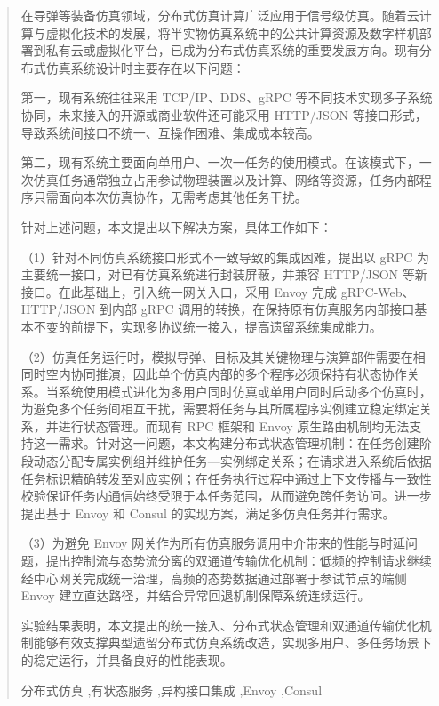 \documentclass[lang=chs, degree=master, blindreview=true, winfonts=true, academic=false]{yanputhesis}
\begin{document}
\begin{abstract}                                            %

在导弹等装备仿真领域，分布式仿真计算广泛应用于信号级仿真。随着云计算与虚拟化技术的发展，将半实物仿真系统中的公共计算资源及数字样机部署到私有云或虚拟化平台，已成为分布式仿真系统的重要发展方向。现有分布式仿真系统设计时主要存在以下问题：

第一，现有系统往往采用 TCP/IP、DDS、gRPC 等不同技术实现多子系统协同，未来接入的开源或商业软件还可能采用 HTTP/JSON 等接口形式，导致系统间接口不统一、互操作困难、集成成本较高。

第二，现有系统主要面向单用户、一次一任务的使用模式。在该模式下，一次仿真任务通常独立占用参试物理装置以及计算、网络等资源，任务内部程序只需面向本次仿真协作，无需考虑其他任务干扰。

针对上述问题，本文提出以下解决方案，具体工作如下：

（1）针对不同仿真系统接口形式不一致导致的集成困难，提出以 gRPC 为主要统一接口，对已有仿真系统进行封装屏蔽，并兼容 HTTP/JSON 等新接口。在此基础上，引入统一网关入口，采用 Envoy 完成 gRPC-Web、HTTP/JSON 到内部 gRPC 调用的转换，在保持原有仿真服务内部接口基本不变的前提下，实现多协议统一接入，提高遗留系统集成能力。

（2）仿真任务运行时，模拟导弹、目标及其关键物理与演算部件需要在相同时空内协同推演，因此单个仿真内部的多个程序必须保持有状态协作关系。当系统使用模式进化为多用户同时仿真或单用户同时启动多个仿真时，为避免多个任务间相互干扰，需要将任务与其所属程序实例建立稳定绑定关系，并进行状态管理。而现有 RPC 框架和 Envoy 原生路由机制均无法支持这一需求。针对这一问题，本文构建分布式状态管理机制：在任务创建阶段动态分配专属实例组并维护任务—实例绑定关系；在请求进入系统后依据任务标识精确转发至对应实例；在任务执行过程中通过上下文传播与一致性校验保证任务内通信始终受限于本任务范围，从而避免跨任务访问。进一步提出基于 Envoy 和 Consul 的实现方案，满足多仿真任务并行需求。

（3）为避免 Envoy 网关作为所有仿真服务调用中介带来的性能与时延问题，提出控制流与态势流分离的双通道传输优化机制：低频的控制请求继续经中心网关完成统一治理，高频的态势数据通过部署于参试节点的端侧 Envoy 建立直达路径，并结合异常回退机制保障系统连续运行。

实验结果表明，本文提出的统一接入、分布式状态管理和双通道传输优化机制能够有效支撑典型遗留分布式仿真系统改造，实现多用户、多任务场景下的稳定运行，并具备良好的性能表现。
\begin{keywords}                                        %
        分布式仿真 \sep 有状态服务 \sep 异构接口集成 \sep Envoy \sep Consul                       %
    \end{keywords}                                          %
\end{abstract}                                              %
\end{document}
